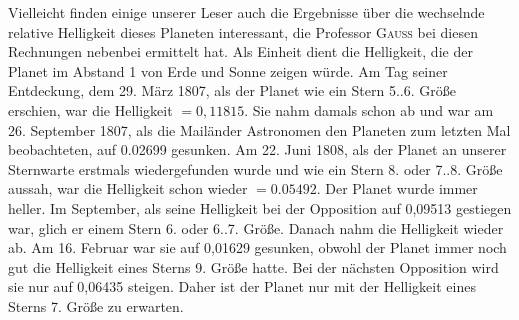 \par\indent Vielleicht finden einige unserer Leser auch die Ergebnisse über die wechselnde relative Helligkeit dieses Planeten interessant, die Professor \textsc{Gauss} bei diesen Rechnungen nebenbei ermittelt hat. Als Einheit dient die Helligkeit, die der Planet im Abstand 1 von Erde und Sonne zeigen würde. Am Tag seiner Entdeckung, dem 29. März 1807, als der Planet wie ein Stern 5..6. Größe erschien, war die Helligkeit $= 0,11815$. Sie nahm damals schon ab und war am 26. September 1807, als die Mailänder Astronomen den Planeten zum letzten Mal beobachteten, auf 0.02699 gesunken. Am 22. Juni 1808, als der Planet an unserer Sternwarte erstmals wiedergefunden wurde und wie ein Stern 8. oder 7..8. Größe aussah, war die Helligkeit schon wieder $= 0.05492$. Der Planet wurde immer heller. Im September, als seine Helligkeit bei der Opposition auf 0,09513 gestiegen war, glich er einem Stern 6. oder 6..7. Größe. Danach nahm die Helligkeit wieder ab. Am 16. Februar war sie auf 0,01629 gesunken, obwohl der Planet immer noch gut die Helligkeit eines Sterns 9. Größe hatte. Bei der nächsten Opposition wird sie nur auf 0,06435 steigen. Daher ist der Planet nur mit der Helligkeit eines Sterns 7. Größe zu erwarten.
